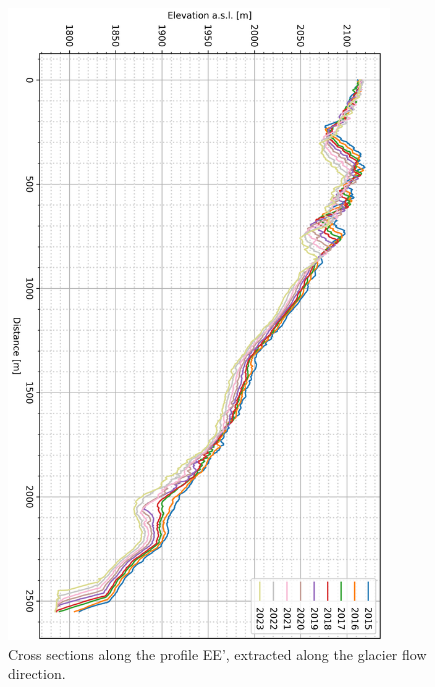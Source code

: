 \begin{figure}[p]
    \centering
\includegraphics[width=0.9\textwidth]{figures/appendix/profile_flow_rot.png}
    \caption{Cross sections along the profile EE', extracted along the glacier flow direction.}
\end{figure}

